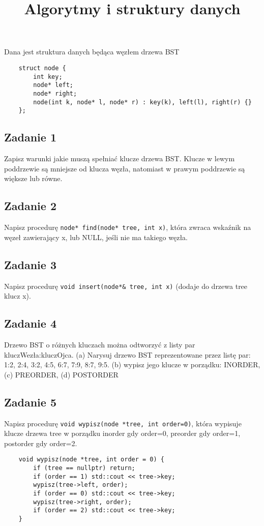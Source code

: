 \documentclass{article}
\begin{document}
\title{Algorytmy i struktury danych}
\author{}
\date{}
\maketitle

Dana jest struktura danych będąca węzłem drzewa BST
\begin{lstlisting}
    struct node {
        int key;
        node* left;
        node* right;
        node(int k, node* l, node* r) : key(k), left(l), right(r) {}
    };
\end{lstlisting}

\subsection*{Zadanie 1}
Zapisz warunki jakie muszą spełniać klucze drzewa BST.
\noindent
Klucze w lewym poddrzewie są mniejsze od klucza węzła, natomiast w prawym poddrzewie są większe lub równe.

\subsection*{Zadanie 2}
Napisz procedurę \verb|node* find(node* tree, int x)|, która zwraca wskaźnik na węzeł
zawierający x, lub NULL, jeśli nie ma takiego węzła.

\subsection*{Zadanie 3}
Napisz procedurę \verb|void insert(node*& tree, int x)| (dodaje do drzewa tree klucz x).

\subsection*{Zadanie 4}
Drzewo BST o różnych kluczach można odtworzyć z listy par kluczWezła:kluczOjca. (a) Narysuj
drzewo BST reprezentowane przez listę par: 1:2, 2:4, 3:2, 4:5, 6:7, 7:9, 8:7, 9:5.
(b) wypisz jego klucze w porządku: INORDER, (c) PREORDER, (d) POSTORDER

\subsection*{Zadanie 5}
Napisz procedurę \verb|void wypisz(node *tree, int order=0)|, która wypisuje klucze drzewa tree
w porządku inorder gdy order=0, preorder gdy order=1, postorder gdy order=2.
\begin{lstlisting}
    void wypisz(node *tree, int order = 0) {
        if (tree == nullptr) return;
        if (order == 1) std::cout << tree->key;
        wypisz(tree->left, order);
        if (order == 0) std::cout << tree->key;
        wypisz(tree->right, order);
        if (order == 2) std::cout << tree->key;
    }
\end{lstlisting}
\end{document}
